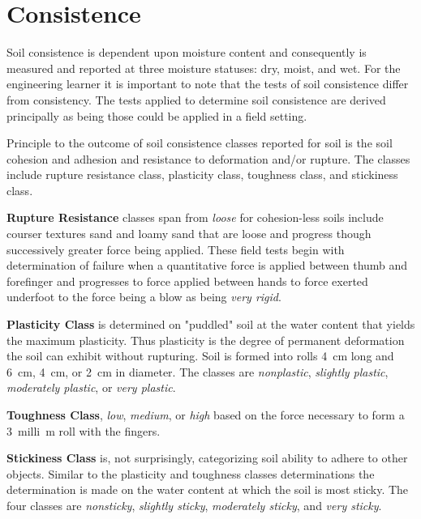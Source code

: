 \documentclass{article}
\begin{document}
\section{Consistence}
\label{consistence}

Soil consistence is dependent upon moisture content and consequently is measured and reported at three moisture statuses: dry, moist, and wet. For the engineering learner it is important to note that the tests of soil consistence differ from consistency. The tests applied to determine soil consistence are derived principally as being those could be applied in a field setting.

Principle to the outcome of soil consistence classes reported for soil is the soil cohesion and adhesion and resistance to deformation and/or rupture. The classes include rupture resistance class, plasticity class, toughness class, and stickiness class.

\textbf{Rupture Resistance} classes span from \textit{loose} for cohesion-less soils include courser textures sand and loamy sand that are loose and progress though successively greater force being applied. These field tests begin with determination of failure when a quantitative force is applied between thumb and forefinger and progresses to force applied between hands to force exerted underfoot to the force being a blow as being \textit{very rigid}.

\textbf{Plasticity Class} is determined on "puddled" soil at the water content that yields the maximum plasticity. Thus plasticity is the degree of permanent deformation the soil can exhibit without rupturing. Soil is formed into rolls \qty{4}{cm} long and \qty{6}{cm}, \qty{4}{cm}, or \qty{2}{cm} in diameter. The classes are \textit{nonplastic}, \textit{slightly plastic}, \textit{moderately plastic}, or \textit{very plastic}.

\textbf{Toughness Class}, \textit{low},  \textit{medium}, or \textit{high} based on the force necessary to form a \qty{3}{milli\metre} roll with the fingers.

 \textbf{Stickiness Class} is, not surprisingly, categorizing soil ability to adhere to other objects. Similar to the plasticity and toughness classes determinations the determination is made on the water content at which the soil is most sticky. The four classes are \textit{nonsticky}, \textit{slightly sticky}, \textit{moderately sticky}, and \textit{very sticky}.
 
 
\end{document}
